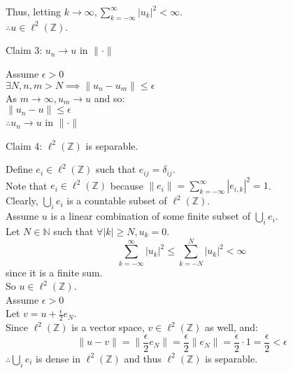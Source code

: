 \documentclass[letterpaper,12pt,fleqn]{article}
\newcommand{\abs}[1]{\left|#1\right|}
\newcommand{\norm}[1]{\lVert#1\rVert}
\newcommand{\Z}{\mathbb{Z}}
\newcommand{\N}{\mathbb{N}}
\newcommand{\ltwoz}{\ell^2(\Z)}
\begin{document}
\begin{description}
\begin{description}
\begin{theproof}
Thus, letting $k\to\infty, \sum_{k=-\infty}^{\infty}\abs{u_k}^2<\infty$. \\
$\therefore u\in\ltwoz$.
\end{theproof}

\item{Claim 3: $u_n\to u$ in $\norm{\cdot}$}
\begin{theproof}
Assume $\epsilon>0$ \\
$\exists N, n,m>N\implies\norm{u_n-u_m}\le\epsilon$ \\
As $m\to\infty, u_m\to u$ and so: \\
$\norm{u_n-u}\le\epsilon$ \\
$\therefore u_n\to u$ in $\norm{\cdot}$
\end{theproof}

\item{Claim 4: $\ltwoz$ is separable}.

Define $e_i\in\ltwoz$ such that $e_{ij}=\delta_{ij}$. \\
Note that $e_i\in\ltwoz$ because
$\norm{e_i}=\sum_{k=-\infty}^{\infty}\abs{e_{i,k}}^2=1$. \\
Clearly, $\bigcup_ie_i$ is a countable subset of $\ltwoz$. \\
Assume $u$ is a linear combination of some finite subset of $\bigcup_ie_i$. \\
Let $N\in\N$ such that $\forall \abs{k}\ge N,u_k=0$.
\[\sum_{k=-\infty}^{\infty}\abs{u_k}^2\le\sum_{k=-N}^{N}\abs{u_k}^2<\infty\]
since it is a finite sum. \\
So $u\in\ltwoz$. \\
Assume $\epsilon>0$ \\
Let $v=u+\frac{\epsilon}{2}e_N$. \\
Since $\ltwoz$ is a vector space, $v\in\ltwoz$ as well, and:
\[\norm{u-v}=\norm{\frac{\epsilon}{2}e_N}=\frac{\epsilon}{2}\norm{e_N}=
    \frac{\epsilon}{2}\cdot1=\frac{\epsilon}{2}<\epsilon\]
$\therefore \bigcup_ie_i$ is dense in $\ltwoz$ and thus $\ltwoz$ is separable.
\end{description}
\end{description}
\end{document}
